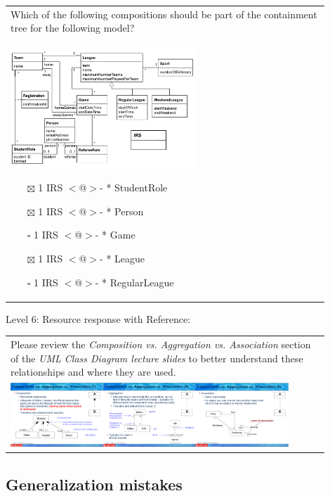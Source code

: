 \begin{tabular}{|p{0.9\linewidth}}

Which of the following compositions should be part of the containment tree for the following
model?

\\
\includegraphics[width=0.6\textwidth]{images/IRS.png}

\begin{itemize}
    \item[$\boxtimes$] 1 IRS $<$@$>$- * StudentRole
    \item[$\boxtimes$] 1 IRS $<$@$>$- * Person
    \item[$\square$] 1 IRS $<$@$>$- * Game
    \item[$\boxtimes$] 1 IRS $<$@$>$- * League
    \item[$\square$] 1 IRS $<$@$>$- * RegularLeague
\end{itemize}

\end{tabular} \medskip

\noindent Level 6: Resource response with Reference: \medskip

\begin{tabular}{|p{0.9\linewidth}}
Please review the \textit{Composition vs. Aggregation vs. Association} section of 
the \textit{UML Class Diagram lecture slides} to 
better understand these relationships and where they are used.

\\
\includegraphics[width=0.9\textwidth]{images/composition_aggregation_association.png}
\end{tabular} \medskip


\subsection{Generalization mistakes}

